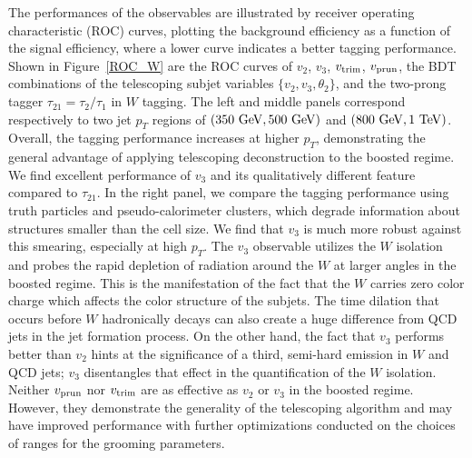 \documentclass[aps,prl,floatfix,preprintnumbers,twocolumn,groupedaddress,nofootinbib]{revtex4-1}
\begin{document}
The performances of the observables are illustrated by receiver operating characteristic (ROC) curves, plotting the background efficiency as a function of the signal efficiency, where a lower curve indicates a better tagging performance. Shown in Figure~\ref{ROC_W} are the ROC curves of $v_2$, $v_3$, $v_{\rm trim}$, $v_{\rm prun}$, the BDT combinations of the telescoping subjet variables $\{v_2, v_3, \theta_2\}$, and the two-prong tagger $\tau_{21}=\tau_{2}/\tau_{1}$ in $W$ tagging. The left and middle panels correspond respectively to two jet $p_T$ regions of $(350~{\rm GeV}, 500~{\rm GeV})$ and $(800~{\rm GeV}, 1~{\rm TeV})$. Overall, the tagging performance increases at higher $p_T$, demonstrating the general advantage of applying telescoping deconstruction to the boosted regime. We find excellent performance of $v_3$ and its qualitatively different feature compared to $\tau_{21}$. In the right panel, we compare the tagging performance using truth particles and pseudo-calorimeter clusters, which degrade information about structures smaller than the cell size. We find that $v_3$ is much more robust against this smearing, especially at high $p_T$. The $v_3$ observable utilizes the $W$ isolation and probes the rapid depletion of radiation around the $W$ at larger angles in the boosted regime. This is the manifestation of the fact that the $W$ carries zero color charge which affects the color structure of the subjets. The time dilation that occurs before $W$ hadronically decays can also create a huge difference from QCD jets in the jet formation process. On the other hand, the fact that $v_3$ performs better than $v_2$ hints at the significance of a third, semi-hard emission in $W$ and QCD jets; $v_3$ disentangles that effect in the quantification of the $W$ isolation. Neither $v_{\rm{prun}}$ nor $v_{\rm{trim}}$ are as effective as $v_2$ or $v_3$ in the boosted regime. However, they demonstrate the generality of the telescoping algorithm and may have improved performance with further optimizations conducted on the choices of ranges for the grooming parameters.
\end{document}
